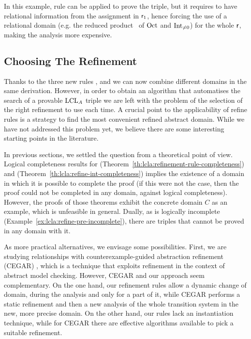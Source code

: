 \begin{example}
	In this example, rule  can be applied to prove the triple, but it requires to have relational information from the assignment  in $\mathsf{r}_1$, hence forcing the use of a relational domain (e.g. the reduced product~\cite{CC79} of $\text{Oct}$ and $\text{Int}_{\neq 0}$) for the whole $\mathsf{r}$, making the analysis more expensive.
\end{example}

\subsection{Choosing The Refinement}\label{sec:choose-refinement}
Thanks to the three new rules ,  and  we can now combine different domains in the same derivation.
However, in order to obtain an algorithm that automatises the search of a provable $\text{LCL}_A$ triple we are left with the problem of the selection of the right refinement to use each time. A crucial point to the applicability of refine rules is a strategy to find the most convenient refined abstract domain. While we have not addressed this problem yet, we believe there are some interesting starting points in the literature.

In previous sections, we settled the question from a theoretical point of view. Logical completeness results for  (Theorem~\ref{th:lcla:refinement-rule-completeness}) and  (Theorem~\ref{th:lcla:refine-int-completeness}) implies the existence of a domain in which it is possible to complete the proof (if this were not the case, then the proof could not be completed in any domain, against logical completeness). However, the proofs of those theorems exhibit the concrete domain $C$ as an example, which is unfeasible in general. Dually, as  is logically incomplete (Example~\ref{ex:lcla:refine-pre-incomplete}), there are triples that cannot be proved in any domain with it.

As more practical alternatives, we envisage some possibilities.
First, we are studying relationships with counterexample\hyp{}guided abstraction refinement (CEGAR) \cite{CGJLV00}, which is a technique that exploits refinement in the context of abstract model checking. However, CEGAR and our approach seem complementary. On the one hand, our refinement rules allow a dynamic change of domain, during the analysis and only for a part of it, while CEGAR performs a static refinement and then a new analysis of the whole transition system in the new, more precise domain. On the other hand, our rules lack an instantiation technique, while for CEGAR there are effective algorithms available to pick a suitable refinement.

